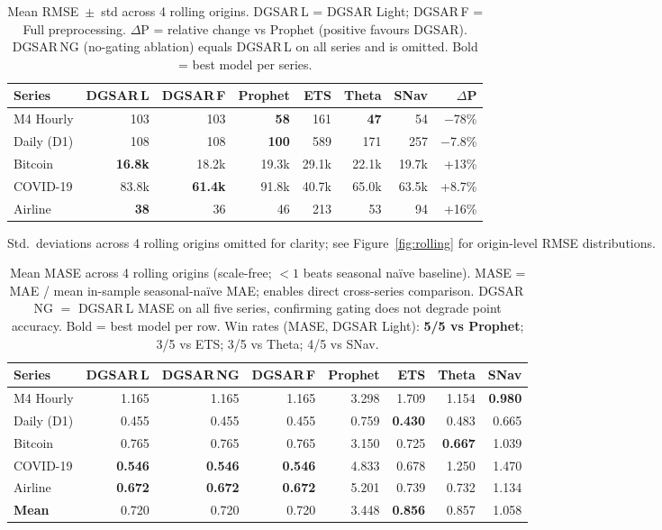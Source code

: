 \documentclass[sn-mathphys-num,pdflatex]{sn-jnl}
\begin{document}
\begin{table}[ht]
\caption{Mean RMSE~$\pm$~std across 4 rolling origins.
DGSAR\,L = DGSAR Light; DGSAR\,F = Full preprocessing.
$\Delta$P = relative change vs Prophet (positive favours DGSAR).
DGSAR\,NG (no-gating ablation) equals DGSAR\,L on all series and is omitted.
Bold = best model per series.}
\label{tab:perf}
\centering
\small
\setlength{\tabcolsep}{3pt}
\begin{tabular}{@{}l r r r r r r r@{}}
\toprule
\textbf{Series} & \textbf{DGSAR\,L} & \textbf{DGSAR\,F}
& \textbf{Prophet} & \textbf{ETS} & \textbf{Theta}
& \textbf{SNav} & \textbf{$\Delta$P} \\
\midrule
M4 Hourly & 103 & 103 & \textbf{58} & 161 & \textbf{47} & 54 & $-$78\% \\
Daily (D1) & 108 & 108 & \textbf{100} & 589 & 171 & 257 & $-$7.8\% \\
Bitcoin & \textbf{16.8k} & 18.2k & 19.3k & 29.1k & 22.1k & 19.7k & +13\% \\
COVID-19 & 83.8k & \textbf{61.4k} & 91.8k & 40.7k & 65.0k & 63.5k & +8.7\% \\
Airline & \textbf{38} & 36 & 46 & 213 & 53 & 94 & +16\% \\
\bottomrule
\end{tabular}

\vspace{4pt}
\scriptsize Std.\ deviations across 4 rolling origins omitted for clarity;
see Figure~\ref{fig:rolling} for origin-level RMSE distributions.
\end{table}

\begin{table}[ht]
\caption{Mean MASE across 4 rolling origins (scale-free; $<1$ beats seasonal na\"{i}ve baseline).
MASE = MAE / mean in-sample seasonal-na\"{i}ve MAE; enables direct cross-series comparison.
DGSAR\,NG $=$ DGSAR\,L MASE on all five series, confirming gating does not degrade point accuracy.
Bold = best model per row.
Win rates (MASE, DGSAR Light): \textbf{5/5 vs Prophet}; 3/5 vs ETS; 3/5 vs Theta; 4/5 vs SNav.}
\label{tab:mase}
\centering
\small
\setlength{\tabcolsep}{3pt}
\begin{tabular}{@{}lrrrrrrr@{}}
\toprule
\textbf{Series} & \textbf{DGSAR\,L} & \textbf{DGSAR\,NG}
& \textbf{DGSAR\,F} & \textbf{Prophet}
& \textbf{ETS} & \textbf{Theta} & \textbf{SNav} \\
\midrule
M4 Hourly & 1.165 & 1.165 & 1.165 & 3.298 & 1.709 & 1.154 & \textbf{0.980} \\
Daily (D1) & 0.455 & 0.455 & 0.455 & 0.759 & \textbf{0.430} & 0.483 & 0.665 \\
Bitcoin & 0.765 & 0.765 & 0.765 & 3.150 & 0.725 & \textbf{0.667} & 1.039 \\
COVID-19 & \textbf{0.546} & \textbf{0.546} & \textbf{0.546} & 4.833 & 0.678 & 1.250 & 1.470 \\
Airline & \textbf{0.672} & \textbf{0.672} & \textbf{0.672} & 5.201 & 0.739 & 0.732 & 1.134 \\
\midrule
\textbf{Mean} & 0.720 & 0.720 & 0.720 & 3.448 & \textbf{0.856} & 0.857 & 1.058 \\
\bottomrule
\end{tabular}
\end{table}
\end{document}
